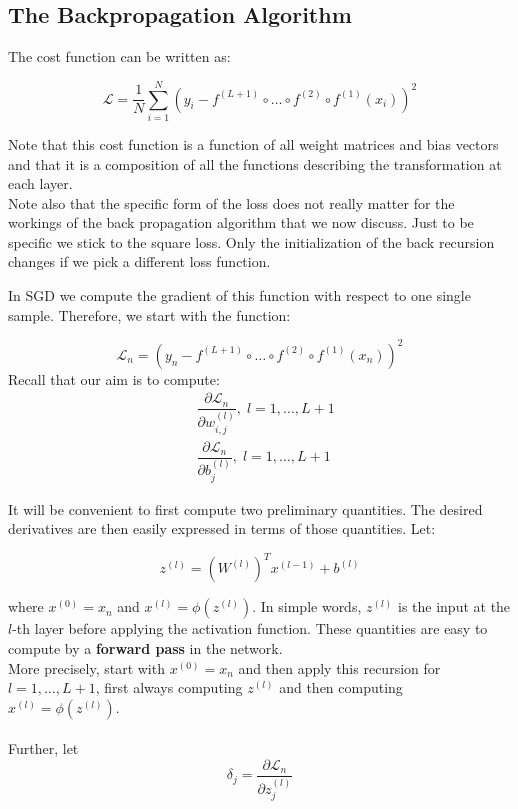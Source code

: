 \documentclass[twoside]{article}
\begin{document}
\subsection{The Backpropagation Algorithm}
The cost function can be written as:

$$\mathcal{L} = \dfrac{1}{N} \sum_{i=1}^{N} (y_{i} -f^{(L+1)} \circ \ldots \circ f^{(2)} \circ f^{(1)}(x_{i}))^2$$

Note that this cost function is a function of all weight matrices and bias vectors and that it is a composition of all the functions describing the transformation at each layer.\\
Note also that the specific form of the loss does not really matter for the workings of the back propagation algorithm that we now discuss. Just to be
specific we stick to the square loss. Only the initialization of the back recursion changes if we pick a different loss function.

In SGD we compute the gradient of this function with respect to one single sample. Therefore, we start with the function:

$$\mathcal{L}_{n} =  (y_{n} -f^{(L+1)} \circ \ldots \circ f^{(2)} \circ f^{(1)}(x_{n}))^2$$
Recall that our aim is to compute:
\begin{equation*}
\begin{aligned}
   & \dfrac{\partial \mathcal{L}_{n} }{\partial  w^{(l)}_{i,j} } , \; l=1,\ldots,L+1 \\
   & \dfrac{\partial \mathcal{L}_{n} }{\partial  b^{(l)}_{j} } , \; l=1,\ldots,L+1
  \end{aligned}
\end{equation*}

It will be convenient to first compute two preliminary quantities. The desired derivatives are then easily expressed in
terms of those quantities.
Let:

$$z^{(l)} = (W^{(l)})^T  x^{(l-1)} + b^{(l)}$$

where $x^{(0)} = x_{n}$ and $x^{(l)} = \phi(z^{(l)})$. In simple words, $z^{(l)}$
is the input at the $l$-th layer before applying the activation function. These quantities are easy to compute by a \textbf{forward pass} in the network. \\More precisely, start with $x^{(0)} = x_{n}$ and
then apply this recursion for $l = 1, \ldots, L + 1$, first always computing $z^{(l)}$ and then computing $x^{(l)} = \phi(z^{(l)})$.\\ \\
Further, let
$$\delta_{j} = \dfrac{\partial \mathcal{L}_{n} }{\partial z^{(l)}_{j}}$$
\end{document}
